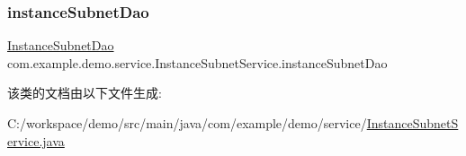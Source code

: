 \subsubsection{\texorpdfstring{instance\+Subnet\+Dao}{instanceSubnetDao}}
{\footnotesize\ttfamily \mbox{\hyperlink{interfacecom_1_1example_1_1demo_1_1dao_1_1_instance_subnet_dao}{Instance\+Subnet\+Dao}} com.\+example.\+demo.\+service.\+Instance\+Subnet\+Service.\+instance\+Subnet\+Dao\hspace{0.3cm}{\ttfamily [package]}}



该类的文档由以下文件生成\+:\begin{DoxyCompactItemize}
\item 
C\+:/workspace/demo/src/main/java/com/example/demo/service/\mbox{\hyperlink{_instance_subnet_service_8java}{Instance\+Subnet\+Service.\+java}}\end{DoxyCompactItemize}
